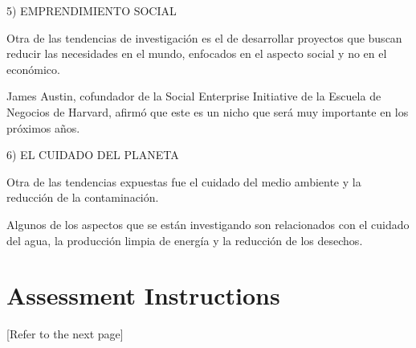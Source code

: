 \documentclass[11pt,a4paper]{article}
\begin{document}
5) EMPRENDIMIENTO SOCIAL

Otra de las tendencias de investigación es el de desarrollar proyectos que buscan reducir las necesidades en el mundo, enfocados en el aspecto social y no en el económico.

James Austin, cofundador de la Social Enterprise Initiative de la Escuela de Negocios de Harvard, afirmó que este es un nicho que será muy importante en los próximos años.


6) EL CUIDADO DEL PLANETA

Otra de las tendencias expuestas fue el cuidado del medio ambiente y la reducción de la contaminación.

Algunos de los aspectos que se están investigando son relacionados con el cuidado del agua, la producción limpia de energía y la reducción de los desechos.


\clearpage
\printbibliography

\appendix %

\section{Assessment Instructions}\label{sec:instructions}
[Refer to the next page]


\end{document}
